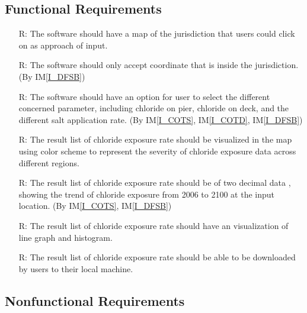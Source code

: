 \documentclass[12pt]{article}
\newcommand{\iref}[1]{IM\ref{#1}}
\newcounter{reqnum} %
\begin{document}
\indent 
\newpage
\subsection{Functional Requirements}

\begin{itemize}
\item[R\refstepcounter{reqnum}\thereqnum \label{R_InputMap}:] The software should have a map of the jurisdiction that users could click on as approach of input.

\item[R\refstepcounter{reqnum}\thereqnum \label{R_Inputs}:] The software should only accept coordinate that is inside the jurisdiction. (By \iref{I_DFSB})

\item[R\refstepcounter{reqnum}\thereqnum \label{R_Parameter}:] The software should have an option for user to select the different concerned parameter, including chloride on pier, chloride on deck, and the different salt application rate. (By \iref{I_COTS}, \iref{I_COTD},  \iref{I_DFSB})

\item[R\refstepcounter{reqnum}\thereqnum \label{R_Map}:] The result list of chloride exposure rate should be visualized in the map using color scheme to represent the severity of chloride exposure data across different regions.

\item[R\refstepcounter{reqnum}\thereqnum \label{R_OutputInputs}:] The result list of chloride exposure rate should be of two decimal data%
, showing the trend of chloride exposure from 2006 to 2100 at the input location. (By \iref{I_COTS}, \iref{I_DFSB})

\item[R\refstepcounter{reqnum}\thereqnum \label{R_OutputVisualization}:] The result list of chloride exposure rate should have an visualization of line graph and histogram. %

\item[R\refstepcounter{reqnum}\thereqnum \label{R_OutputDownload}:] The result list of chloride exposure rate %
should be able to be downloaded by users to their local machine. 


\end{itemize}


\subsection{Nonfunctional Requirements}
\end{document}
